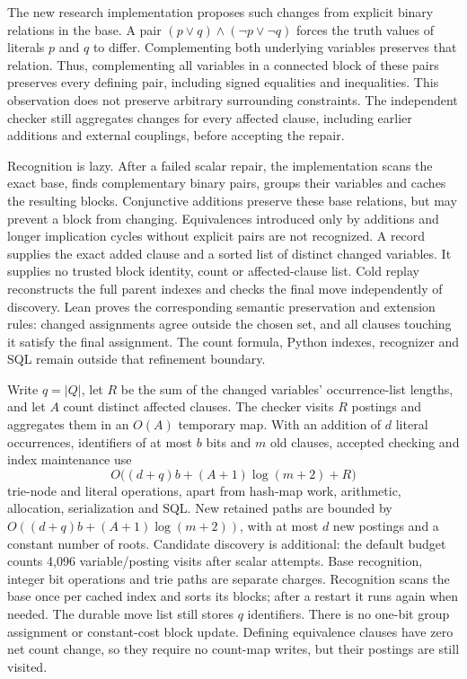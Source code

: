 \documentclass[11pt,a4paper]{article}
\numberwithin{equation}{section}
\theoremstyle{plain}
\theoremstyle{definition}
\theoremstyle{remark}
\begin{document}
The new research implementation proposes such changes from explicit binary relations in the base. A pair $(p\lor q)\land(\neg p\lor\neg q)$ forces the truth values of literals $p$ and $q$ to differ. Complementing both underlying variables preserves that relation. Thus, complementing all variables in a connected block of these pairs preserves every defining pair, including signed equalities and inequalities. This observation does not preserve arbitrary surrounding constraints. The independent checker still aggregates changes for every affected clause, including earlier additions and external couplings, before accepting the repair.

Recognition is lazy. After a failed scalar repair, the implementation scans the exact base, finds complementary binary pairs, groups their variables and caches the resulting blocks. Conjunctive additions preserve these base relations, but may prevent a block from changing. Equivalences introduced only by additions and longer implication cycles without explicit pairs are not recognized. A record supplies the exact added clause and a sorted list of distinct changed variables. It supplies no trusted block identity, count or affected-clause list. Cold replay reconstructs the full parent indexes and checks the final move independently of discovery. Lean proves the corresponding semantic preservation and extension rules: changed assignments agree outside the chosen set, and all clauses touching it satisfy the final assignment. The count formula, Python indexes, recognizer and SQL remain outside that refinement boundary.

Write $q=|Q|$, let $R$ be the sum of the changed variables' occurrence-list lengths, and let $A$ count distinct affected clauses. The checker visits $R$ postings and aggregates them in an $O(A)$ temporary map. With an addition of $d$ literal occurrences, identifiers of at most $b$ bits and $m$ old clauses, accepted checking and index maintenance use
\[
O\bigl((d+q)b+(A+1)\log(m+2)+R\bigr)
\]
trie-node and literal operations, apart from hash-map work, arithmetic, allocation, serialization and SQL. New retained paths are bounded by $O((d+q)b+(A+1)\log(m+2))$, with at most $d$ new postings and a constant number of roots. Candidate discovery is additional: the default budget counts 4,096 variable/posting visits after scalar attempts. Base recognition, integer bit operations and trie paths are separate charges. Recognition scans the base once per cached index and sorts its blocks; after a restart it runs again when needed. The durable move list still stores $q$ identifiers. There is no one-bit group assignment or constant-cost block update. Defining equivalence clauses have zero net count change, so they require no count-map writes, but their postings are still visited.
\end{document}
